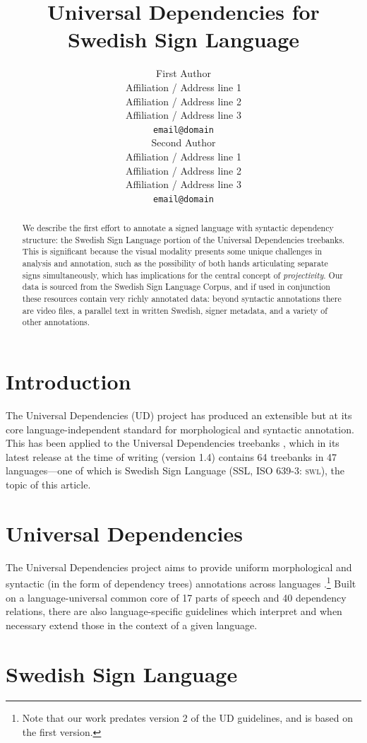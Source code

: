 \documentclass[11pt]{article}
\title{Universal Dependencies for Swedish Sign Language}
\author{First Author \\
  Affiliation / Address line 1 \\
  Affiliation / Address line 2 \\
  Affiliation / Address line 3 \\
  {\tt email@domain} \\\And
  Second Author \\
  Affiliation / Address line 1 \\
  Affiliation / Address line 2 \\
  Affiliation / Address line 3 \\
  {\tt email@domain} \\}
\date{}
\begin{document}
\maketitle
\begin{abstract}
    We describe the first effort to annotate a signed language with syntactic
    dependency structure: the Swedish Sign Language portion of the
    Universal Dependencies treebanks. This is significant because the
    visual modality presents some unique challenges in analysis and
    annotation, such as the possibility of
    both hands articulating separate signs simultaneously, which has
    implications for the central concept of \emph{projectivity}.
    Our data is sourced from the Swedish Sign Language Corpus,
    and if used in conjunction these resources contain very richly
    annotated data: beyond syntactic annotations there are video files,
    a parallel text in written Swedish, signer metadata,
    and a variety of other annotations.
\end{abstract}

\section{Introduction}

The Universal Dependencies (UD) project \cite{Nivre2016ud} 
has produced an extensible but at its core language-independent standard for
morphological and syntactic annotation. This has been applied to the Universal
Dependencies treebanks \cite{ud14}, which in its latest release at the time of
writing (version 1.4) contains 64 treebanks in 47 languages---one of which is
Swedish Sign Language (SSL, ISO 639-3: \textsc{swl}), the topic of this
article.


\section{Universal Dependencies}

The Universal Dependencies project aims to provide uniform morphological and
syntactic (in the form of dependency trees) annotations across languages
\cite{Nivre2016ud}.\footnote{Note that our work predates version 2 of the UD
guidelines, and is based on the first version.}
Built on a language-universal common core of 17 parts of speech and
40 dependency relations, there are also language-specific guidelines which
interpret and when necessary extend those in the context of a given language.

\section{Swedish Sign Language}
\end{document}
